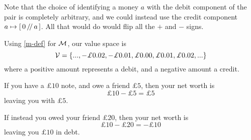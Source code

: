Note that the choice of identifying a money $a$ with the debit component of the pair is completely arbitrary,
and we could instead use the credit component $a \mapsto \left[\,0\,/\!/\,a\,\right]$.
All that would do would flip all the $+$ and $-$ signs.

\begin{example}
    Using \eqref{m-def} for $\mathcal{M}$, our value space is
    \begin{equation*}
        \V = \{ ..., -\pounds 0.02, -\pounds 0.01, \pounds 0.00, \pounds 0.01, \pounds 0.02, ... \}
    \end{equation*}
    where a positive amount represents a debit, and a negative amount a credit.
\end{example}

\begin{example}
    If you have a $\pounds 10$ note, and owe a friend $\pounds 5$, then your net worth is
    \begin{equation*}
        \pounds 10 - \pounds 5 = \pounds 5
    \end{equation*}
    leaving you with $\pounds 5$.

    If instead you owed your friend $\pounds 20$, then your net worth is
    \begin{equation*}
        \pounds 10 - \pounds 20 = -\pounds 10
    \end{equation*}
    leaving you $\pounds 10$ in debt.
\end{example}
